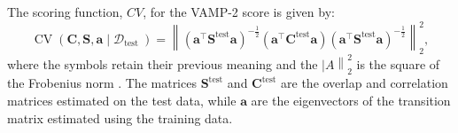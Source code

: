 The scoring function, $CV$, for the VAMP-2 score  \cite{wuVariationalApproachLearning2019} is given by: 
\begin{equation}
\operatorname{CV}\left(\mathbf{C}, \mathbf{S}, \mathbf{a} \mid \mathcal{D}_{\text {test }}\right) 
=\left\|\left(\mathbf{a}^{\top} \mathbf{S}^{\text{test}} \mathbf{a}\right)^{-\frac{1}{2}}\left(\mathbf{a}^{\top} \mathbf{C}^{\text{test}} \mathbf{a}\right)\left(\mathbf{a}^{\top} \mathbf{S}^{\text{test}} \mathbf{a}\right)^{-\frac{1}{2}}\right\|_{2}^{2}, 
\end{equation}
where the symbols retain their previous meaning and the $\left| A\right\|_{2}^{2}$ is the square of the Frobenius norm \cite{wuVariationalApproachLearning2019}. The matrices $\mathbf{S}^{\text{test}}$ and $\mathbf{C}^{\text{test}}$ are the overlap and correlation matrices estimated on the test data, while $\mathbf{a}$ are the eigenvectors of the transition matrix estimated using the training data. 




